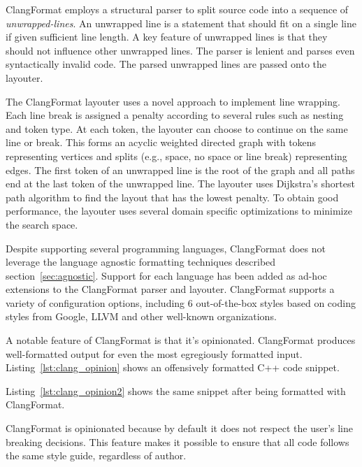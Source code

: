 ClangFormat employs a structural parser to split source code into a sequence of \emph{unwrapped-lines}.
An unwrapped line is a statement that should fit on a single line if given sufficient line length.
A key feature of unwrapped lines is that they should not influence other unwrapped lines.
The parser is lenient and parses even syntactically invalid code.
The parsed unwrapped lines are passed onto the layouter.

The ClangFormat layouter uses a novel approach to implement line wrapping.
Each line break is assigned a penalty according to several rules such as nesting and token type.
At each token, the layouter can choose to continue on the same line or break.
This forms an acyclic weighted directed graph with tokens representing vertices and splits (e.g., space, no space or line break) representing edges.
The first token of an unwrapped line is the root of the graph and all paths end at the last token of the unwrapped line.
The layouter uses Dijkstra's\autocite{dijkstra_note_1959} shortest path algorithm to find the layout that has the lowest penalty.
To obtain good performance, the layouter uses several domain specific optimizations to minimize the search space.

Despite supporting several programming languages, ClangFormat does not leverage the language agnostic formatting techniques described section~\ref{sec:agnostic}.
Support for each language has been added as ad-hoc extensions to the ClangFormat parser and layouter.
ClangFormat supports a variety of configuration options, including 6 out-of-the-box styles based on coding styles from Google, LLVM and other well-known organizations.

A notable feature of ClangFormat is that it's opinionated.
ClangFormat produces well-formatted output for even the most egregiously formatted input.
Listing~\ref{lst:clang_opinion} shows an offensively formatted C++ code snippet.

Listing~\ref{lst:clang_opinion2} shows the same snippet after being formatted with ClangFormat.

ClangFormat is opinionated because by default it does not respect the user's line breaking decisions.
This feature makes it possible to ensure that all code follows the same style guide, regardless of author.

